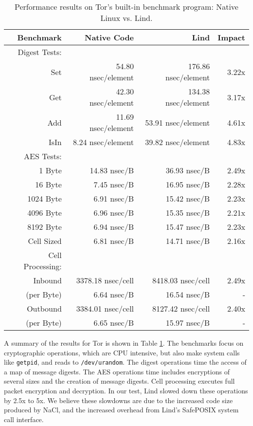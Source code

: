 {{{\begin{table}
\centering
\scriptsize
\begin{tabular}{|r|r|r|r|}
  \hline
  {\bf Benchmark} & {\bf Native Code} & {\bf Lind} & {\bf Impact}  \\
  \hline
  Digest Tests: & & & \\
  Set & 54.80 nsec/element & 176.86 nsec/element & 3.22x \\
  Get & 42.30 nsec/element & 134.38 nsec/element & 3.17x \\
  Add & 11.69 nsec/element & 53.91 nsec/element & 4.61x \\
  IsIn & 8.24 nsec/element & 39.82 nsec/element & 4.83x \\
  \hline
  AES Tests: & & & \\
  1 Byte & 14.83 nsec/B & 36.93 nsec/B & 2.49x \\
  16 Byte & 7.45 nsec/B & 16.95 nsec/B & 2.28x \\
  1024 Byte & 6.91 nsec/B & 15.42 nsec/B & 2.23x \\
  4096 Byte & 6.96 nsec/B & 15.35 nsec/B & 2.21x \\
  8192 Byte & 6.94 nsec/B & 15.47 nsec/B & 2.23x \\
  Cell Sized & 6.81 nsec/B & 14.71 nsec/B & 2.16x \\
  \hline
  Cell Processing: & & & \\
  Inbound & 3378.18 nsec/cell & 8418.03 nsec/cell & 2.49x \\
  (per Byte) & 6.64 nsec/B & 16.54 nsec/B & - \\
  Outbound & 3384.01 nsec/cell & 8127.42 nsec/cell & 2.40x \\
  (per Byte) & 6.65 nsec/B & 15.97 nsec/B & - \\
  \hline
\end{tabular}
\caption{\small Performance results on Tor's built-in benchmark program: Native
Linux vs. Lind.}
\label{table:performance_tor}
\end{table}

A summary of the results for Tor is shown in Table \ref{table:performance_tor}. The
benchmarks focus on cryptographic operations,
which are CPU intensive, but also make system calls like \texttt{getpid}, and reads to
\texttt{/dev/urandom}.
The digest operations time the access of a map of message digests.
The AES operations time includes encryptions of several sizes and the creation of
message digests. Cell processing executes full packet encryption and decryption. In our
test, Lind slowed down these operations by 2.5x to 5x. We believe these
slowdowns are due to the increased code size produced by NaCl,
and the increased overhead from Lind's SafePOSIX system call interface.

}}}
